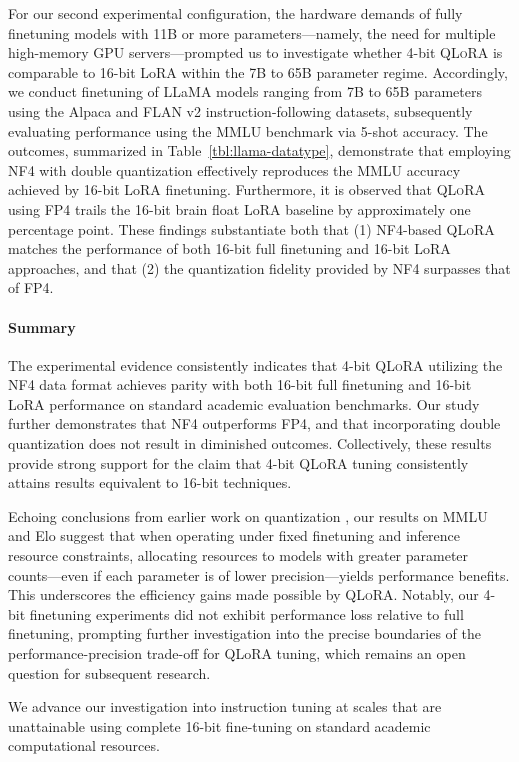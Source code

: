 For our second experimental configuration, the hardware demands of fully finetuning models with 11B or more parameters—namely, the need for multiple high-memory GPU servers—prompted us to investigate whether 4-bit \textsc{QLoRA} is comparable to 16-bit LoRA within the 7B to 65B parameter regime. Accordingly, we conduct finetuning of LLaMA models ranging from 7B to 65B parameters using the Alpaca and FLAN v2 instruction-following datasets, subsequently evaluating performance using the MMLU benchmark via 5-shot accuracy. The outcomes, summarized in Table~\ref{tbl:llama-datatype}, demonstrate that employing NF4 with double quantization effectively reproduces the MMLU accuracy achieved by 16-bit LoRA finetuning. Furthermore, it is observed that \textsc{QLoRA} using FP4 trails the 16-bit brain float LoRA baseline by approximately one percentage point. These findings substantiate both that (1) NF4-based \textsc{QLoRA} matches the performance of both 16-bit full finetuning and 16-bit LoRA approaches, and that (2) the quantization fidelity provided by NF4 surpasses that of FP4.

\paragraph{Summary} The experimental evidence consistently indicates that 4-bit \textsc{QLoRA} utilizing the NF4 data format achieves parity with both 16-bit full finetuning and 16-bit LoRA performance on standard academic evaluation benchmarks. Our study further demonstrates that NF4 outperforms FP4, and that incorporating double quantization does not result in diminished outcomes. Collectively, these results provide strong support for the claim that 4-bit \textsc{QLoRA} tuning consistently attains results equivalent to 16-bit techniques.

Echoing conclusions from earlier work on quantization \citep{dettmers2022case}, our results on MMLU and Elo suggest that when operating under fixed finetuning and inference resource constraints, allocating resources to models with greater parameter counts—even if each parameter is of lower precision—yields performance benefits. This underscores the efficiency gains made possible by \textsc{QLoRA}. Notably, our 4-bit finetuning experiments did not exhibit performance loss relative to full finetuning, prompting further investigation into the precise boundaries of the performance-precision trade-off for QLoRA tuning, which remains an open question for subsequent research.

We advance our investigation into instruction tuning at scales that are unattainable using complete 16-bit fine-tuning on standard academic computational resources.

